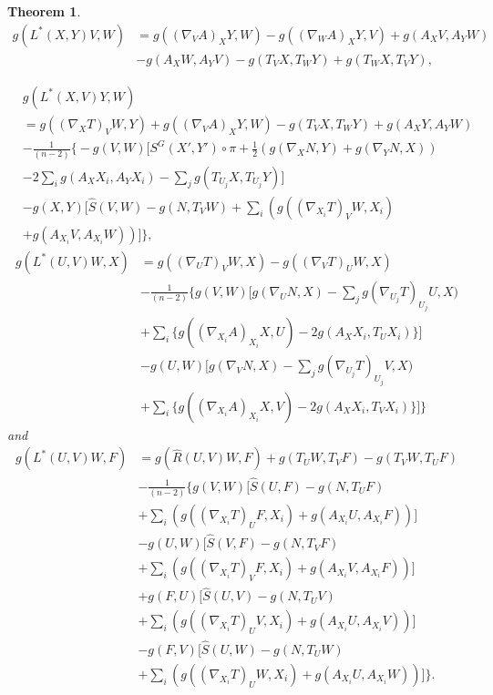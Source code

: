 \documentclass{birkjour}
\newtheorem{theorem}{Theorem}[section]
\theoremstyle{definition}
\theoremstyle{remark}
\numberwithin{equation}{section}
\begin{document}
\begin{theorem}
	\begin{align*}
		g(L^* (X,Y)V, W)&= g((\nabla_V A)_X Y, W)- g((\nabla_W A)_X Y, V)+ g(A_X V, A_Y W)\\
		&- g(A_X W, A_Y V) - g(T_V X, T_W Y) + g(T_W X, T_V Y),
	\end{align*}
	
	\begin{align*}
		&g(L^* (X,V)Y ,W)\\
		&=g((\nabla_X T)_V W, Y) + g((\nabla_V A)_X Y,W)- g(T_V X, T_W Y) + g(A_X Y, A_Y W)\\
		&-\frac{1}{(n-2)} \bigg\{ - g(V,W) \Big[ S^G (X', Y') \circ \pi + \frac{1}{2} \left(g(\nabla_X N,Y)+ g(\nabla_Y N,X)\right) \\
		&- 2 \sum_{i} g(A_X X_i, A_Y X_i) -\sum_{j} g(T_{U_j}X, T_{U_j}Y) \Big]\\
		& - g(X,Y) \Big[\hat{S} (V,W) -g(N,T_V W) + \sum_{i}\left(g((\nabla_{X_i}T)_V W,X_i) \right.\\
		& \left. + g(A_{X_i} V, A_{X_i}W)  \right) \Big] \bigg\},
	\end{align*}
	\begin{align*}
		g(L^* (U,V)W ,X)
		&=g((\nabla_U T)_V W, X) - g((\nabla_V T)_U W, X)\\
		&- \frac{1}{(n-2)} \bigg\{g(V,W) \Big[g(\nabla_U N,X) -\sum_{j} g(\nabla_{U_j}T)_{U_j}U,X)  \\
		&+ \sum_{i} \{g((\nabla_{X_i}A)_{X_i} X,U)-2g(A_X {X_i}, T_U X_i)\}\Big] \\
		&- g(U,W)  \Big[g(\nabla_V N,X) -\sum_{j} g(\nabla_{U_j}T)_{U_j}V,X)  \\
		&+ \sum_{i} \{g((\nabla_{X_i}A)_{X_i} X,V)-2g(A_X {X_i}, T_V X_i)\}\Big] \bigg\}
	\end{align*}
	and
	\begin{align*}
		g(L^* (U,V)W ,F)&= g(\hat{R} (U,V)W, F) + g(T_U W, T_V F) - g(T_V W, T_U F ) \\
		&- \frac{1}{(n-2)} \bigg\{g(V,W) \Big[\hat{S}(U,F) -g(N, T_U F)\\
		&+ \sum_{i}\left(g((\nabla_{X_i}T)_U F, X_i)+g(A_{X_i}U,A_{X_i}F)\right)\Big]\\
		&-g(U,W) \Big[\hat{S}(V,F)-g(N,T_V F) \\
		&+ \sum_{i}\left(g((\nabla_{X_i}T)_V F, X_i)+ g(A_{X_i} V, A_{X_i}F)\right)\Big] \\
		&+g(F,U) \Big[ \hat{S}(U,V)- g(N, T_U V) \\
		& + \sum_{i}\left(g((\nabla_{X_i}T)_U V, {X_i})+ g(A_{X_i}U, A_{X_i}V)\right)  \Big] \\
		&-g(F,V) \Big[ \hat{S}(U,W) -g(N,T_U W)\\
		&+ \sum_{i}\left( g((\nabla_{X_i}T)_U W, X_i)+ g(A_{X_i}U, A_{X_i}W) \right) \Big] \bigg\}.
	\end{align*}
\end{theorem}
\end{document}
